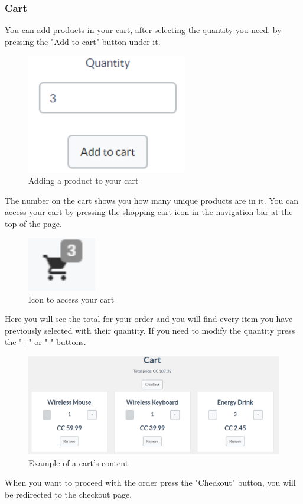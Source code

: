 		\subsubsection{Cart}
		You can add products in your cart, after selecting the quantity you need, 
		by pressing the "Add to cart" button under it.
	\begin{figure}[H]
		\includegraphics[width=7cm]{res/images/add_to_cart.png}
		\centering
		\caption{Adding a product to your cart}
	\end{figure}
	\noindent The number on the cart shows you how many unique products are 
	in it. You can access your cart by pressing the shopping cart icon in 
	the navigation bar at the top of the page.
	\begin{figure}[H]
		\includegraphics[width=3cm]{res/images/cart_icon.png}
		\centering
		\caption{Icon to access your cart}
	\end{figure}
	\noindent Here you will see the total for your order and you will find 
	every item you have previously selected with their quantity. If you 
	need to modify the quantity press the "+" or "-" buttons.
	\begin{figure}[H]
		\includegraphics[width=15cm]{res/images/cart_example.png}
		\centering
		\caption{Example of a cart's content}
	\end{figure}
	\noindent When you want to proceed with the order press the "Checkout" button, 
	you will be redirected to the checkout page.
